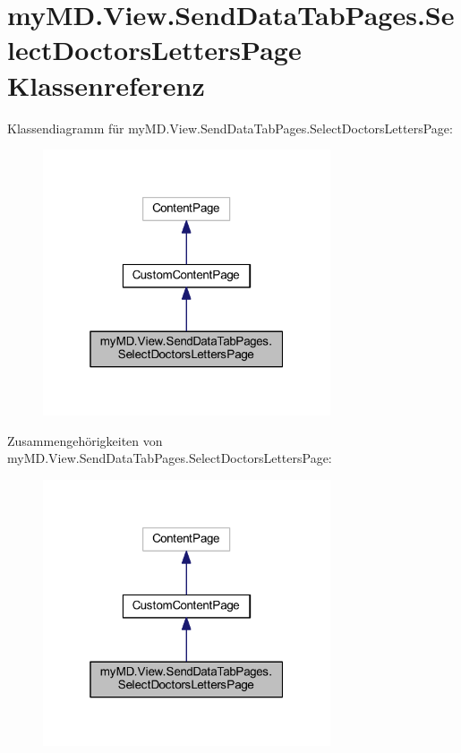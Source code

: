 \hypertarget{classmy_m_d_1_1_view_1_1_send_data_tab_pages_1_1_select_doctors_letters_page}{}\section{my\+M\+D.\+View.\+Send\+Data\+Tab\+Pages.\+Select\+Doctors\+Letters\+Page Klassenreferenz}
\label{classmy_m_d_1_1_view_1_1_send_data_tab_pages_1_1_select_doctors_letters_page}


Klassendiagramm für my\+M\+D.\+View.\+Send\+Data\+Tab\+Pages.\+Select\+Doctors\+Letters\+Page\+:\nopagebreak
\begin{figure}[H]
\begin{center}
\leavevmode
\includegraphics[width=241pt]{classmy_m_d_1_1_view_1_1_send_data_tab_pages_1_1_select_doctors_letters_page__inherit__graph}
\end{center}
\end{figure}


Zusammengehörigkeiten von my\+M\+D.\+View.\+Send\+Data\+Tab\+Pages.\+Select\+Doctors\+Letters\+Page\+:\nopagebreak
\begin{figure}[H]
\begin{center}
\leavevmode
\includegraphics[width=241pt]{classmy_m_d_1_1_view_1_1_send_data_tab_pages_1_1_select_doctors_letters_page__coll__graph}
\end{center}
\end{figure}
